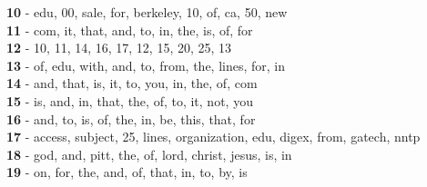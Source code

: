 \textbf{10} - edu, 00, sale, for, berkeley, 10, of, ca, 50, new\\
\textbf{11} - com, it, that, and, to, in, the, is, of, for\\
\textbf{12} - 10, 11, 14, 16, 17, 12, 15, 20, 25, 13\\
\textbf{13} - of, edu, with, and, to, from, the, lines, for, in\\
\textbf{14} - and, that, is, it, to, you, in, the, of, com\\
\textbf{15} - is, and, in, that, the, of, to, it, not, you\\
\textbf{16} - and, to, is, of, the, in, be, this, that, for\\
\textbf{17} - access, subject, 25, lines, organization, edu, digex, from, gatech, nntp\\
\textbf{18} - god, and, pitt, the, of, lord, christ, jesus, is, in\\
\textbf{19} - on, for, the, and, of, that, in, to, by, is\\
